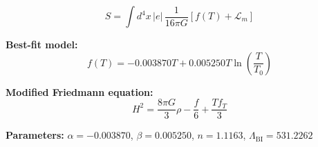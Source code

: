 
\begin{equation}
  S = \int d^4x \, |e| \, \frac{1}{16\pi G} \left[ f(T) + \mathcal{L}_m \right]
\end{equation}

\textbf{Best-fit model:}
\begin{equation}
  f(T) = -0.003870 T + 0.005250 T \ln\!\left(\frac{T}{T_0}\right)
\end{equation}

\textbf{Modified Friedmann equation:}
\begin{equation}
  H^2 = \frac{8\pi G}{3} \rho - \frac{f}{6} + \frac{T f_T}{3}
\end{equation}

\textbf{Parameters:}
$\alpha = -0.003870$, \quad
$\beta = 0.005250$, \quad
$n = 1.1163$, \quad
$\Lambda_{\text{BI}} = 531.2262$